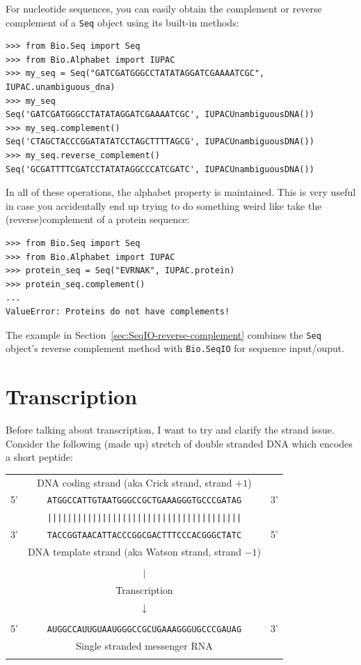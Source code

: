 \documentclass{report}
\begin{document}
For nucleotide sequences, you can easily obtain the complement or reverse complement of a \verb|Seq| object using its built-in methods:

\begin{verbatim}
>>> from Bio.Seq import Seq
>>> from Bio.Alphabet import IUPAC
>>> my_seq = Seq("GATCGATGGGCCTATATAGGATCGAAAATCGC", IUPAC.unambiguous_dna)
>>> my_seq
Seq('GATCGATGGGCCTATATAGGATCGAAAATCGC', IUPACUnambiguousDNA())
>>> my_seq.complement()
Seq('CTAGCTACCCGGATATATCCTAGCTTTTAGCG', IUPACUnambiguousDNA())
>>> my_seq.reverse_complement()
Seq('GCGATTTTCGATCCTATATAGGCCCATCGATC', IUPACUnambiguousDNA())
\end{verbatim}

In all of these operations, the alphabet property is maintained. This is very useful in case you accidentally end up trying to do something weird like take the (reverse)complement of a protein sequence:

\begin{verbatim}
>>> from Bio.Seq import Seq
>>> from Bio.Alphabet import IUPAC
>>> protein_seq = Seq("EVRNAK", IUPAC.protein)
>>> protein_seq.complement()
...
ValueError: Proteins do not have complements!
\end{verbatim}

The example in Section~\ref{sec:SeqIO-reverse-complement} combines the \verb|Seq|
object's reverse complement method with \verb|Bio.SeqIO| for sequence input/ouput.

\section{Transcription}
Before talking about transcription, I want to try and clarify the strand issue.
Consider the following (made up) stretch of double stranded DNA which
encodes a short peptide:

\begin{tabular}{rcl}
\\
   & {\small DNA coding strand (aka Crick strand, strand $+1$)} & \\
5' & \texttt{ATGGCCATTGTAATGGGCCGCTGAAAGGGTGCCCGATAG} & 3' \\
   & \texttt{|||||||||||||||||||||||||||||||||||||||} & \\
3' & \texttt{TACCGGTAACATTACCCGGCGACTTTCCCACGGGCTATC} & 5' \\
   & {\small DNA template strand (aka Watson strand, strand $-1$)} & \\
\\
   & {\LARGE $|$} &\\
   & Transcription & \\
   & {\LARGE $\downarrow$} &\\
\\
5' & \texttt{AUGGCCAUUGUAAUGGGCCGCUGAAAGGGUGCCCGAUAG} & 3' \\
   & {\small Single stranded messenger RNA} & \\
\\
\end{tabular}
\end{document}
